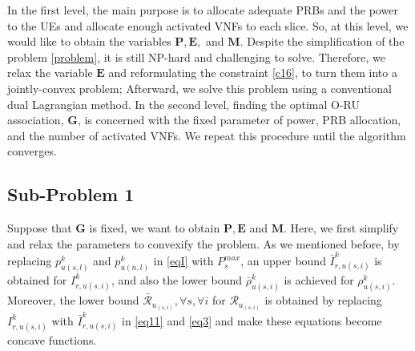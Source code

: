 \documentclass[lettersize,journal]{IEEEtran}
\begin{document}
In the first level, the main purpose is to allocate adequate PRBs and the power to the UEs and allocate enough activated VNFs
to each slice. So, at this level, we would like to obtain the variables $\boldsymbol{P}, \boldsymbol{E},$ and $\boldsymbol{M}$.
Despite the simplification of the problem
\eqref{problem}, it is still NP-hard and challenging to solve. Therefore,
we relax the variable $\boldsymbol{E}$ \cite{lee2018dynamic,ali2018joint} and reformulating the constraint \eqref{c16},
to turn them into a jointly-convex problem; Afterward, we solve this problem using a conventional dual Lagrangian method. 
In the second level, finding the optimal O-RU association, $ \boldsymbol{G}$, is concerned with the fixed parameter of power, PRB allocation, and the number of activated VNFs.   
We repeat this procedure until the algorithm converges.

\subsection{Sub-Problem 1}\label{sub1}
Suppose that $\boldsymbol{G}$ is fixed, we want to obtain $\boldsymbol{P}, \boldsymbol{E}$ and $\boldsymbol{M}$.
Here, we first simplify and relax the parameters to convexify the problem.
As we mentioned before, by replacing $p_{u(s,l)}^{k}$ and $p_{u(n,l)}^{k}$ in \eqref{eqI} with $P^{max}_s$, an upper bound $\bar{I}_{r,u(s,i)}^{k}$ is obtained for $I_{r,u(s,i)}^{k}$, and also the lower bound $\bar{\rho}_{u(s,i)}^{k}$ is achieved
for $\rho_{u(s,i)}^{k}$. 
Moreover, the lower bound $\bar{\mathcal{R}}_{u_{(s,i)}}, \forall s , \forall i$ for  ${\mathcal{R}}_{u_{(s,i)}}$ is obtained by replacing $I_{r,u(s,i)}^{k}$ with $\bar{I}_{r,u(s,i)}^{k}$ in \eqref{eq11} and \eqref{eq3} and make these equations become concave functions.
\end{document}
